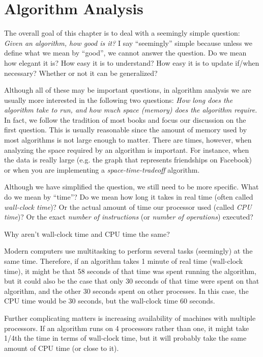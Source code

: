 \newpage
\section{Algorithm Analysis}\label{sec:algAnalysis}

The overall goal of this chapter is to deal with a seemingly simple question:
{\em Given an algorithm, how good is it?}
I say ``seemingly'' simple because unless we define what we mean by ``good'', we cannot
answer the question. 
Do we mean how elegant it is?  How easy it is to understand?
How easy it is to update if/when necessary?  Whether or not it can be generalized?

Although all of these may be important questions, in algorithm analysis we are usually more interested
in the following two questions:  
{\em How long does the algorithm take to run, and how much space (memory) 
does the algorithm require.}  
In fact, we follow the tradition of most books and focus our discussion on the first question.
This is usually reasonable since the amount of memory used by most algorithms is not large 
enough to matter.  There are times, however, when analyzing the space required by an algorithm is
important.  For instance, when the data is really large (e.g. the graph that represents 
friendships on Facebook) or when you are implementing a {\em space-time-tradeoff} algorithm.

Although we have simplified the question, we still need to be more specific.  
What do we mean by ``time''?
Do we mean how long it takes in real time (often called {\em wall-clock time})?
Or the actual amount of time our processor used (called {\em CPU time})?
Or the exact {\em number of instructions} (or {\em number of operations}) executed?  

\begin{ques}
Why aren't wall-clock time and CPU time the same? 

\noindent
\answerlinethree
\begin{answer}
Modern computers use multitasking to perform several tasks (seemingly) at the same time.
Therefore, if an algorithm takes 1 minute of real time (wall-clock time), it might be that
58 seconds of that time was spent running the algorithm, but it could also be the case that
only 30 seconds of that time were spent on that algorithm, and the other 30 seconds spent
on other processes.  In this case, the CPU time would be 30 seconds, but the wall-clock time
60 seconds.

Further complicating matters is increasing availability of machines
with multiple processors.  If an algorithm runs on 4 processors rather than one, it 
might take 1/4th the time in terms of wall-clock time, but it will probably take the
same amount of CPU time (or close to it).
\end{answer}
\end{ques}

